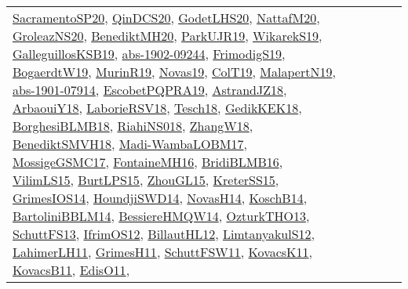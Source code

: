 {\begin{longtable}{lp{3cm}>{\raggedright}p{6cm}>{\raggedright}p{6cm}p{8cm}}
\href{articles/SacramentoSP20.pdf}{SacramentoSP20}\cite{SacramentoSP20}, \href{articles/QinDCS20.pdf}{QinDCS20}\cite{QinDCS20}, \href{papers/GodetLHS20.pdf}{GodetLHS20}\cite{GodetLHS20}, \href{papers/NattafM20.pdf}{NattafM20}\cite{NattafM20}, \href{papers/GroleazNS20.pdf}{GroleazNS20}\cite{GroleazNS20}, \href{articles/BenediktMH20.pdf}{BenediktMH20}\cite{BenediktMH20}, \href{papers/ParkUJR19.pdf}{ParkUJR19}\cite{ParkUJR19}, \href{articles/WikarekS19.pdf}{WikarekS19}\cite{WikarekS19}, \href{papers/GalleguillosKSB19.pdf}{GalleguillosKSB19}\cite{GalleguillosKSB19}, \href{articles/abs-1902-09244.pdf}{abs-1902-09244}\cite{abs-1902-09244}, \href{papers/FrimodigS19.pdf}{FrimodigS19}\cite{FrimodigS19}, \href{papers/BogaerdtW19.pdf}{BogaerdtW19}\cite{BogaerdtW19}, \href{papers/MurinR19.pdf}{MurinR19}\cite{MurinR19}, \href{articles/Novas19.pdf}{Novas19}\cite{Novas19}, \href{papers/ColT19.pdf}{ColT19}\cite{ColT19}, \href{papers/MalapertN19.pdf}{MalapertN19}\cite{MalapertN19}, \href{articles/abs-1901-07914.pdf}{abs-1901-07914}\cite{abs-1901-07914}, \href{articles/EscobetPQPRA19.pdf}{EscobetPQPRA19}\cite{EscobetPQPRA19}, \href{papers/AstrandJZ18.pdf}{AstrandJZ18}\cite{AstrandJZ18}, \href{papers/ArbaouiY18.pdf}{ArbaouiY18}\cite{ArbaouiY18}, \href{articles/LaborieRSV18.pdf}{LaborieRSV18}\cite{LaborieRSV18}, \href{papers/Tesch18.pdf}{Tesch18}\cite{Tesch18}, \href{articles/GedikKEK18.pdf}{GedikKEK18}\cite{GedikKEK18}, \href{articles/BorghesiBLMB18.pdf}{BorghesiBLMB18}\cite{BorghesiBLMB18}, \href{papers/RiahiNS018.pdf}{RiahiNS018}\cite{RiahiNS018}, \href{articles/ZhangW18.pdf}{ZhangW18}\cite{ZhangW18}, \href{papers/BenediktSMVH18.pdf}{BenediktSMVH18}\cite{BenediktSMVH18}, \href{papers/Madi-WambaLOBM17.pdf}{Madi-WambaLOBM17}\cite{Madi-WambaLOBM17}, \href{papers/MossigeGSMC17.pdf}{MossigeGSMC17}\cite{MossigeGSMC17}, \href{papers/FontaineMH16.pdf}{FontaineMH16}\cite{FontaineMH16}, \href{articles/BridiBLMB16.pdf}{BridiBLMB16}\cite{BridiBLMB16}, \href{papers/VilimLS15.pdf}{VilimLS15}\cite{VilimLS15}, \href{papers/BurtLPS15.pdf}{BurtLPS15}\cite{BurtLPS15}, \href{papers/ZhouGL15.pdf}{ZhouGL15}\cite{ZhouGL15}, \href{papers/KreterSS15.pdf}{KreterSS15}\cite{KreterSS15}, \href{articles/GrimesIOS14.pdf}{GrimesIOS14}\cite{GrimesIOS14}, \href{papers/HoundjiSWD14.pdf}{HoundjiSWD14}\cite{HoundjiSWD14}, \href{articles/NovasH14.pdf}{NovasH14}\cite{NovasH14}, \href{papers/KoschB14.pdf}{KoschB14}\cite{KoschB14}, \href{papers/BartoliniBBLM14.pdf}{BartoliniBBLM14}\cite{BartoliniBBLM14}, \href{papers/BessiereHMQW14.pdf}{BessiereHMQW14}\cite{BessiereHMQW14}, \href{articles/OzturkTHO13.pdf}{OzturkTHO13}\cite{OzturkTHO13}, \href{papers/SchuttFS13.pdf}{SchuttFS13}\cite{SchuttFS13}, \href{papers/IfrimOS12.pdf}{IfrimOS12}\cite{IfrimOS12}, \href{papers/BillautHL12.pdf}{BillautHL12}\cite{BillautHL12}, \href{articles/LimtanyakulS12.pdf}{LimtanyakulS12}\cite{LimtanyakulS12}, \href{papers/LahimerLH11.pdf}{LahimerLH11}\cite{LahimerLH11}, \href{papers/GrimesH11.pdf}{GrimesH11}\cite{GrimesH11}, \href{articles/SchuttFSW11.pdf}{SchuttFSW11}\cite{SchuttFSW11}, \href{articles/KovacsK11.pdf}{KovacsK11}\cite{KovacsK11}, \href{articles/KovacsB11.pdf}{KovacsB11}\cite{KovacsB11}, \href{papers/EdisO11.pdf}{EdisO11}\cite{EdisO11}, 
\end{longtable}}
